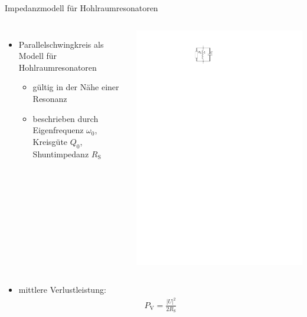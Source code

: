 \documentclass[12pt,xcolor=dvipsnames,professionalfonts]{beamer}
\begin{document}
\begin{frame}{Impedanzmodell für Hohlraumresonatoren}
	\begin{columns}[c]
		\begin{itemize}
			\item Parallelschwingkreis als Modell für Hohlraumresonatoren
			\begin{itemize}
				\setlength\itemsep{0.25em}
				\item gültig in der Nähe einer Resonanz
				
				\item beschrieben durch Eigenfrequenz $\omega_0$, Kreisgüte $Q_0$, Shuntimpedanz $R_\mathrm{S}$
			\end{itemize}
		\end{itemize}
		
		\centering
		\includegraphics[scale=1.15]{./figures/RLC_circuit.pdf}
	\end{columns}
	\vfill
	\begin{itemize}
		\item mittlere Verlustleistung:
		\begin{align*}
		P_\mathrm{V} = \frac{\left|U\right|^2}{2 R_\mathrm{S}}
		\end{align*}
	\end{itemize}
\end{frame}
\end{document}
